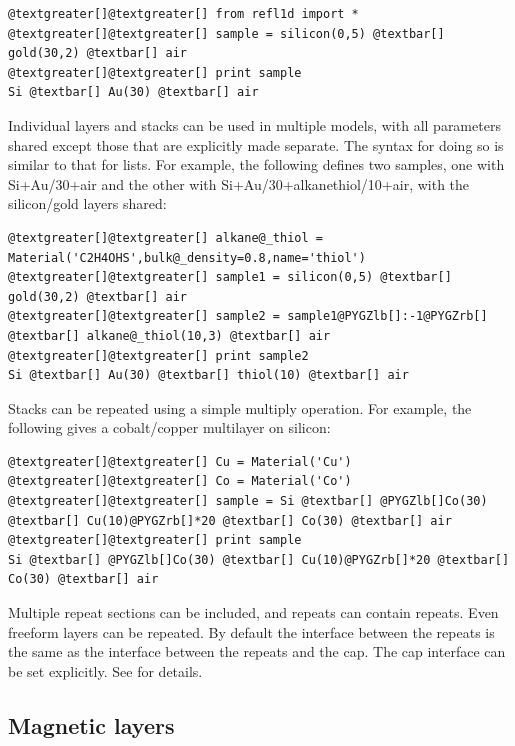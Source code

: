\documentclass[letterpaper,10pt,english]{sphinxmanual}
\begin{document}
\begin{Verbatim}[commandchars=@\[\]]
@textgreater[]@textgreater[] from refl1d import *
@textgreater[]@textgreater[] sample = silicon(0,5) @textbar[] gold(30,2) @textbar[] air
@textgreater[]@textgreater[] print sample
Si @textbar[] Au(30) @textbar[] air
\end{Verbatim}

Individual layers and stacks can be used in multiple models, with all
parameters shared except those that are explicitly made separate.  The
syntax for doing so is similar to that for lists.  For example, the
following defines two samples, one with Si+Au/30+air and the other with
Si+Au/30+alkanethiol/10+air, with the silicon/gold layers shared:

\begin{Verbatim}[commandchars=@\[\]]
@textgreater[]@textgreater[] alkane@_thiol = Material('C2H4OHS',bulk@_density=0.8,name='thiol')
@textgreater[]@textgreater[] sample1 = silicon(0,5) @textbar[] gold(30,2) @textbar[] air
@textgreater[]@textgreater[] sample2 = sample1@PYGZlb[]:-1@PYGZrb[] @textbar[] alkane@_thiol(10,3) @textbar[] air
@textgreater[]@textgreater[] print sample2
Si @textbar[] Au(30) @textbar[] thiol(10) @textbar[] air
\end{Verbatim}

Stacks can be repeated using a simple multiply operation.  For example,
the following gives a cobalt/copper multilayer on silicon:

\begin{Verbatim}[commandchars=@\[\]]
@textgreater[]@textgreater[] Cu = Material('Cu')
@textgreater[]@textgreater[] Co = Material('Co')
@textgreater[]@textgreater[] sample = Si @textbar[] @PYGZlb[]Co(30) @textbar[] Cu(10)@PYGZrb[]*20 @textbar[] Co(30) @textbar[] air
@textgreater[]@textgreater[] print sample
Si @textbar[] @PYGZlb[]Co(30) @textbar[] Cu(10)@PYGZrb[]*20 @textbar[] Co(30) @textbar[] air
\end{Verbatim}

Multiple repeat sections can be included, and repeats can contain repeats.
Even freeform layers can be repeated.  By default the interface between
the repeats is the same as the interface between the repeats and the cap.
The cap interface can be set explicitly.  See  for
details.


\subsection{Magnetic layers}
\label{guide/sample:magnetic-layers}
\end{document}
